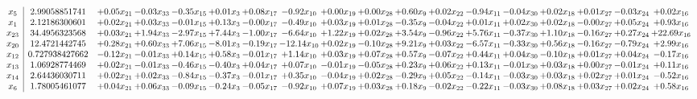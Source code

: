 \documentclass[9pt]{article}
\begin{document}
\[\begin{array}{c| c c@{\hskip 2pt} c@{\hskip 2pt} c@{\hskip 2pt} c@{\hskip 2pt} c@{\hskip 2pt} c@{\hskip 2pt} c@{\hskip 2pt} c@{\hskip 2pt} c@{\hskip 2pt} c@{\hskip 2pt} c@{\hskip 2pt} c@{\hskip 2pt} c@{\hskip 2pt} c@{\hskip 2pt} c@{\hskip 2pt} c@{\hskip 2pt} }
 x_{5}   &  2.99058851741 & +  0.05 x_{21} & -0.03 x_{33} & -0.35 x_{15} & +  0.01 x_{3} & +  0.08 x_{17} & -0.92 x_{10} & +  0.00 x_{19} & +  0.00 x_{28} & +  0.60 x_{9} & +  0.02 x_{22} & -0.94 x_{11} & -0.04 x_{30} & +  0.02 x_{18} & +  0.01 x_{27} & -0.03 x_{24} & +  0.02 x_{16}\\
 x_{1}   &  2.12186300601 & +  0.02 x_{21} & +  0.03 x_{33} & -0.01 x_{15} & +  0.13 x_{3} & -0.00 x_{17} & -0.49 x_{10} & +  0.03 x_{19} & +  0.01 x_{28} & -0.35 x_{9} & -0.04 x_{22} & +  0.01 x_{11} & +  0.02 x_{30} & +  0.02 x_{18} & -0.00 x_{27} & +  0.05 x_{24} & +  0.93 x_{16}\\
 x_{23}   &  34.4956323568 & +  0.03 x_{21} & +  1.94 x_{33} & -2.97 x_{15} & +  7.44 x_{3} & -1.00 x_{17} & -6.64 x_{10} & +  1.22 x_{19} & +  0.02 x_{28} & +  3.54 x_{9} & -0.96 x_{22} & +  5.76 x_{11} & -0.37 x_{30} & +  1.10 x_{18} & -0.16 x_{27} & +  0.27 x_{24} & + 22.69 x_{16}\\
 x_{20}   &  12.4721442745 & +  0.28 x_{21} & +  0.60 x_{33} & +  7.06 x_{15} & -8.01 x_{3} & -0.19 x_{17} & -12.14 x_{10} & +  0.02 x_{19} & -0.10 x_{28} & +  9.21 x_{9} & +  0.03 x_{22} & -6.57 x_{11} & -0.33 x_{30} & +  0.56 x_{18} & -0.16 x_{27} & -0.79 x_{24} & +  2.99 x_{16}\\
 x_{12}   &  0.727938427662 & -0.12 x_{21} & -0.01 x_{33} & +  0.14 x_{15} & +  0.58 x_{3} & -0.01 x_{17} & +  1.14 x_{10} & +  0.03 x_{19} & +  0.07 x_{28} & +  0.57 x_{9} & -0.07 x_{22} & +  0.44 x_{11} & +  0.04 x_{30} & -0.10 x_{18} & +  0.01 x_{27} & +  0.04 x_{24} & -0.17 x_{16}\\
 x_{13}   &  1.06928774469 & +  0.02 x_{21} & -0.01 x_{33} & -0.46 x_{15} & -0.40 x_{3} & +  0.04 x_{17} & +  0.07 x_{10} & -0.01 x_{19} & -0.05 x_{28} & +  0.23 x_{9} & +  0.06 x_{22} & +  0.13 x_{11} & -0.01 x_{30} & +  0.03 x_{18} & +  0.00 x_{27} & -0.01 x_{24} & +  0.11 x_{16}\\
 x_{14}   &  2.64436030711 & +  0.02 x_{21} & +  0.02 x_{33} & -0.84 x_{15} & -0.37 x_{3} & -0.01 x_{17} & +  0.35 x_{10} & -0.04 x_{19} & +  0.02 x_{28} & -0.29 x_{9} & +  0.05 x_{22} & -0.14 x_{11} & -0.03 x_{30} & +  0.03 x_{18} & +  0.02 x_{27} & +  0.01 x_{24} & -0.52 x_{16}\\
 x_{6}   &  1.78005461077 & +  0.04 x_{21} & +  0.06 x_{33} & -0.09 x_{15} & -0.24 x_{3} & -0.05 x_{17} & -0.92 x_{10} & +  0.07 x_{19} & +  0.03 x_{28} & +  0.18 x_{9} & -0.02 x_{22} & -0.22 x_{11} & -0.03 x_{30} & +  0.08 x_{18} & +  0.03 x_{27} & +  0.02 x_{24} & +  0.58 x_{16}\\

\end{array}\]
\end{document}
